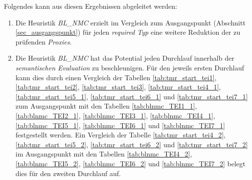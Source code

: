 Folgendes kann aus diesen Ergebnissen abgeleitet werden:
\begin{enumerate}
\item Die \Gls{Heuristik} \emph{BL\_NMC} erzielt im Vergleich zum Ausgangspunkt (Abschnitt \ref{sec_ausgangspunkt}) für jeden \emph{required Typ} eine weitere Reduktion der zu prüfenden \emph{Proxies}.

\item Die Heuristik \emph{BL\_NMC} hat das Potential jeden Durchlauf innerhalb der \emph{semantischen Evaluation} zu beschleunigen. Für den jeweils ersten Durchlauf kann dies durch einen Vergleich der Tabellen \ref{tab:tmr_start_tei1}, \ref{tab:tmr_start_tei2}, \ref{tab:tmr_start_tei3}, \ref{tab:tmr_start_tei4_1}, \ref{tab:tmr_start_tei5_1}, \ref{tab:tmr_start_tei6_1} und \ref{tab:tmr_start_tei7_1} zum Ausgangspunkt mit den Tabellen \ref{tab:blnmc_TEI1_1}, \ref{tab:blnmc_TEI2_1}, \ref{tab:blnmc_TEI3_1}, \ref{tab:blnmc_TEI4_1}, \ref{tab:blnmc_TEI5_1}, \ref{tab:blnmc_TEI6_1} und \ref{tab:blnmc_TEI7_1} festgestellt werden. Ein Vergleich der Tabelle \ref{tab:tmr_start_tei4_2}, \ref{tab:tmr_start_tei5_2}, \ref{tab:tmr_start_tei6_2} und \ref{tab:tmr_start_tei7_2} im Ausgangspunkt mit den Tabellen \ref{tab:blnmc_TEI4_2}, \ref{tab:blnmc_TEI5_2}, \ref{tab:blnmc_TEI6_2} und \ref{tab:blnmc_TEI7_2} belegt dies für den zweiten Durchlauf auf.
\end{enumerate}

